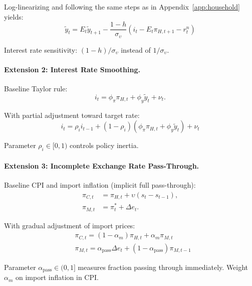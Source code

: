 \documentclass[12pt,a4paper]{article}
\begin{document}
\begin{appendices}
Log-linearizing and following the same steps as in Appendix~\ref{app:household} yields:
\begin{equation}
	\boxed{\tilde{y}_t = E_t\tilde{y}_{t+1} - \frac{1-h}{\sigma_\upsilon}(i_t - E_t\pi_{H,t+1} - r_t^n)}
	\label{eq:app_IS_habit}
	\tag{With habit}
\end{equation}

Interest rate sensitivity: $(1-h)/\sigma_\upsilon$ instead of $1/\sigma_\upsilon$.

\paragraph{Extension 2: Interest Rate Smoothing.}
Baseline Taylor rule:
\begin{equation}
	i_t = \phi_\pi\pi_{H,t} + \phi_y\tilde{y}_t + \nu_t.
	\tag{Baseline}
\end{equation}

With partial adjustment toward target rate:
\begin{equation}
	\boxed{i_t = \rho_i i_{t-1} + (1-\rho_i)(\phi_\pi\pi_{H,t} + \phi_y\tilde{y}_t) + \nu_t}
	\label{eq:app_taylor_smooth}
	\tag{With smoothing}
\end{equation}

Parameter $\rho_i \in [0,1)$ controls policy inertia.

\paragraph{Extension 3: Incomplete Exchange Rate Pass-Through.}
Baseline CPI and import inflation (implicit full pass-through):
\begin{align}
	\pi_{C,t} &= \pi_{H,t} + \upsilon(s_t - s_{t-1}), \tag{Baseline CPI} \\
	\pi_{M,t} &= \pi_t^* + \Delta e_t.  \tag{Full pass-through}
\end{align}

With gradual adjustment of import prices:
\begin{align}
	&\boxed{\pi_{C,t} = (1-\alpha_m)\pi_{H,t} + \alpha_m\pi_{M,t}} \label{eq:app_cpi_incomplete} \tag{Modified CPI} \\
	&\boxed{\pi_{M,t} = \alpha_{\text{pass}}\Delta e_t + (1-\alpha_{\text{pass}})\pi_{M,t-1}} \label{eq:app_import_incomplete_ext} \tag{Incomplete PT}
\end{align}

Parameter $\alpha_{\text{pass}} \in (0,1]$ measures fraction passing through immediately. Weight $\alpha_m$ on import inflation in CPI.


\end{appendices}
\end{document}
